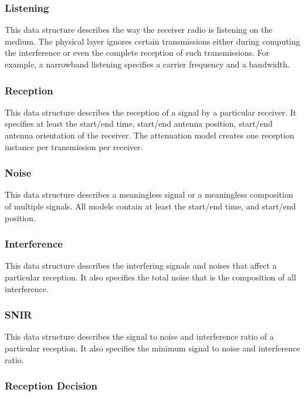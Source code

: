 \subsubsection{Listening}

This data structure describes the way the receiver radio is listening on the
medium. The physical layer ignores certain transmissions either during computing
the interference or even the complete reception of such transmissions. For
example, a narrowband listening specifies a carrier frequency and a bandwidth.

\subsubsection{Reception}

This data structure describes the reception of a signal by a particular receiver.
It specifies at least the start/end time, start/end antenna position, start/end
antenna orientation of the receiver. The attenuation model creates one reception
instance per transmission per receiver.

\subsubsection{Noise}

This data structure describes a meaningless signal or a meaningless composition
of multiple signals. All models contain at least the start/end time, and
start/end position.

\subsubsection{Interference}

This data structure describes the interfering signals and noises that affect a
particular reception. It also specifies the total noise that is the composition
of all interference.

\subsubsection{SNIR}

This data structure describes the signal to noise and interference ratio of a
particular reception. It also specifies the minimum signal to noise and
interference ratio.

\subsubsection{Reception Decision}


